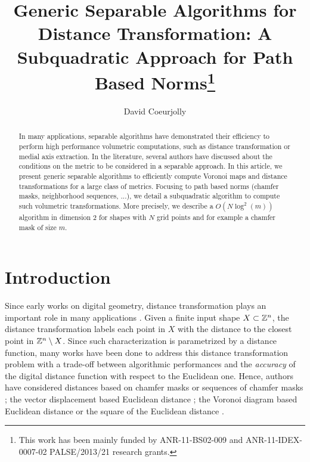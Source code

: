 \documentclass{llncs}
\title{Generic Separable Algorithms for Distance Transformation: A
  Subquadratic Approach for Path Based Norms\thanks{This work has been
    mainly funded by ANR-11-BS02-009 and ANR-11-IDEX-0007-02
    PALSE/2013/21 research grants.}}
\author{David Coeurjolly\inst{1}}
\institute{ CNRS,  LIRIS, UMR5205, F-69621, France\\
   \email{david.coeurjolly@liris.cnrs.fr}
}
\begin{document}
\maketitle


\begin{abstract}
In many applications, separable algorithms have demonstrated their
efficiency to perform high performance volumetric computations, such
as distance transformation or medial axis extraction. In the
literature, several authors have discussed about the conditions on the
metric to be considered in a separable approach.  In this article, we
present generic separable algorithms to efficiently compute Voronoi
maps and distance transformations for a large class of
metrics. Focusing to path based norms (chamfer masks, neighborhood
sequences, ...), we detail a subquadratic algorithm to compute such
volumetric transformations. More precisely, we describe a
$O(N\log^2(m))$ algorithm in dimension 2 for shapes with $N$ grid
points and for example a chamfer mask of size $m$.

\end{abstract}

\section{Introduction}
\label{sec:introduction}

Since early works on digital geometry, distance transformation plays
an important role in many applications
\cite{Rosenfeld1966,Rosenfeld1968}. Given a finite input shape
$X\subset {\mathbb{Z}}^n$, the distance transformation labels each point in $X$
with the distance to the closest point in ${\mathbb{Z}}^n \setminus X$. Since
such characterization is parametrized by a distance function, many
works have been done to address this distance transformation problem
with a trade-off between algorithmic performances and the
\emph{accuracy} of the digital distance function with respect to the
Euclidean one.  Hence, authors have considered distances based on
chamfer masks
\cite{Rosenfeld1968,borgefors,Thiel_IWCIA7,fouard:ivc:2005} or
sequences of chamfer masks
\cite{ROSEN_66,mukherjee,Nagy05,Strand2008,DBLP:conf/dgci/NormandSE13};
the vector displacement based Euclidean distance
\cite{danielson,ragnemalm,MULL_92,Cuisenaire1999_268}; the Voronoi
diagram based Euclidean distance
\cite{BreuEtAl95,maurer_pami} or the square of the
Euclidean distance \cite{SaitTori:94,Hirata,roerdnik}.
\end{document}
